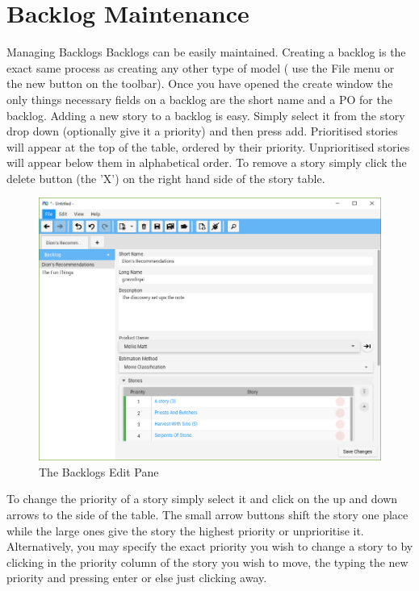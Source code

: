 \section{Backlog Maintenance}

Managing Backlogs
\newline\newline
Backlogs can be easily maintained. Creating a backlog is the exact same process as creating any other type of model ( use the File menu or the new button on the toolbar). Once you have opened the create window the only things necessary fields on a backlog are the short name and a PO for the backlog.
\newline
Adding a new story to a backlog is easy. Simply select it from the story drop down (optionally give it a priority) and then press add. Prioritised stories will appear at the top of the table, ordered by their priority. Unprioritised stories will appear below them in alphabetical order. To remove a story simply click the delete button (the 'X') on the right hand side of the story table.

\begin{figure}[H]
\centering
\includegraphics[width=\textwidth]{images/screenshots/backlogs.PNG}
\caption{The Backlogs Edit Pane}
\label{fig:new_project}
\end{figure}

\bigskip
To change the priority of a story simply select it and click on the up and down arrows to the side of the table. The small arrow buttons shift the story one place while the large ones give the story the highest priority or unprioritise it. Alternatively, you may specify the exact priority you wish to change a story to by clicking in the priority column of the story you wish to move, the typing the new priority and pressing enter or else just clicking away.

